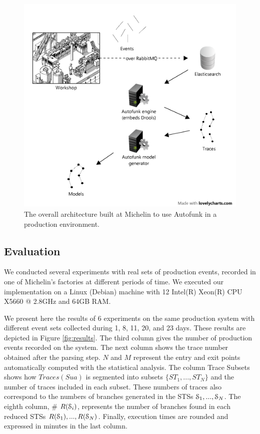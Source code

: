 \begin{figure}[ht]
    \includegraphics[width=1.0\linewidth]{figures/model-gen-branded.png}

    \caption{The overall architecture built at Michelin to use
    Autofunk in a production environment.}
    \label{fig:autofunk_gen_branded}
\end{figure}

\subsection{Evaluation}

We conducted several experiments with real sets of production
events, recorded in one of Michelin's factories at different
periods of time. We executed our implementation on a Linux
(Debian) machine with 12 Intel(R) Xeon(R) CPU X5660 @ 2.8GHz and
64GB RAM.

We present here the results of 6 experiments on the same
production system with different event sets collected during 1,
8, 11, 20, and 23 days. These results are depicted in Figure
\ref{fig:results}. The third column gives the number of
production events recorded on the system. The next column shows
the trace number obtained after the parsing step.  $N$ and $M$
represent the entry and exit points automatically computed with
the statistical analysis. The column Trace Subsets shows how
$Traces(Sua)$ is segmented into subsets $\{ST_1,...,ST_N\}$ and
the number of traces included in each subset. These numbers of
traces also correspond to the numbers of branches generated in
the STSs $\EuScript{S}_1,...,\EuScript{S}_N$. The eighth column,
\# $R(\EuScript{S}_i)$, represents the number of branches found
in each reduced STSs $R(\EuScript{S}_1),...,R(\EuScript{S}_N)$.
Finally, execution times are rounded and expressed in minutes in
the last column.

